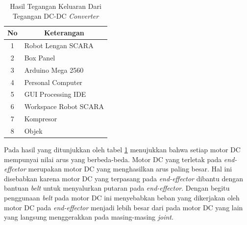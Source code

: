 \begin{table}[H]
	\centering
	\caption{Hasil Tegangan Keluaran Dari Tegangan DC-DC \textit{Converter}}
	
	\begin{tabular}{|c|l|}
		\hline
		\rowcolor[HTML]{9B9B9B} 
		\label{tbl.motordc}
		No & \multicolumn{1}{c|}{\cellcolor[HTML]{9B9B9B}Keterangan} \\ \hline
		1  & Robot Lengan SCARA                                      \\ \hline
		2  & Box Panel                                               \\ \hline
		3  & Arduino Mega 2560                                       \\ \hline
		4  & Personal Computer                                       \\ \hline
		5  & GUI Processing IDE                                      \\ \hline
		6  & Workspace Robot SCARA                                   \\ \hline
		7  & Kompresor                                               \\ \hline
		8  & Objek                                                   \\ \hline
	\end{tabular}
	
\end{table} 

Pada hasil yang ditunjukkan oleh tabel \ref{tbl.motordc} menujukkan bahwa setiap motor DC mempunyai nilai arus yang berbeda-beda. Motor DC yang terletak pada \textit{end-effcetor} merupakan motor DC yang menghasilkan arus paling besar. Hal ini disebabkan karena motor DC yang terpasang pada \textit{end-effector} dibantu dengan bantuan \textit{belt} untuk menyalurkan putaran pada\textit{ end-effector}. Dengan begitu penggunaan \textit{belt} pada motor DC ini menyebabkan beban yang dikerjakan oleh motor DC pada \textit{end-effector} menjadi lebih besar dari pada motor DC yang lain yang langsung menggerakkan pada masing-masing \textit{joint}.

